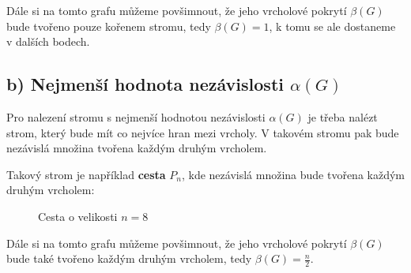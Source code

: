 \documentclass[10pt, a4paper]{ReportSheet}
\begin{document}
\begin{uloha}{9}{2}
        Dále si na tomto grafu můžeme povšimnout, že jeho vrcholové pokrytí $\beta(G)$ bude tvořeno pouze kořenem
        stromu, tedy $\beta(G) = 1$, k tomu se ale dostaneme v dalších bodech.


        \subsection{b) Nejmenší hodnota nezávislosti $\alpha(G)$}
        Pro nalezení stromu s nejmenší hodnotou nezávislosti $\alpha(G)$ je třeba nalézt strom, který bude mít co
        nejvíce hran mezi vrcholy. V takovém stromu pak bude nezávislá množina tvořena každým druhým vrcholem.

        Takový strom je například \textbf{cesta} $P_n$, kde nezávislá množina bude tvořena každým druhým vrcholem:
        \begin{figure}[H]
            \centering
            \caption{Cesta o velikosti $n=8$}
            \label{fig:ukol-2-9-cesta}
        \end{figure}

        Dále si na tomto grafu můžeme povšimnout, že jeho vrcholové pokrytí $\beta(G)$ bude také tvořeno každým druhým vrcholem, tedy $\beta(G) = \frac{n}{2}$.



\end{uloha}
\end{document}
